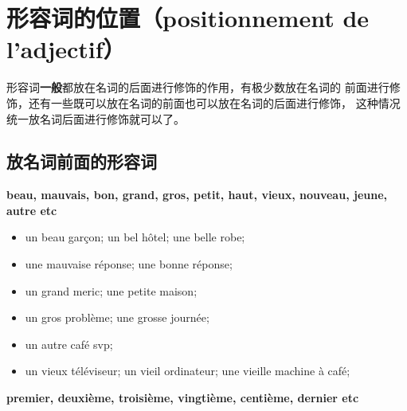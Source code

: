 
\chapter{形容词的位置（positionnement de l'adjectif）}

形容词\textbf{一般}都放在名词的后面进行修饰的作用，有极少数放在名词的
前面进行修饰，还有一些既可以放在名词的前面也可以放在名词的后面进行修饰，
这种情况统一放名词后面进行修饰就可以了。

\section{放名词前面的形容词}

\textbf{beau, mauvais, bon, grand, gros, petit, haut, vieux, nouveau, jeune,
autre etc}

\begin{itemize}
\item un beau garçon; un bel hôtel; une belle robe;
\item une mauvaise réponse; une bonne réponse;
\item un grand meric; une petite maison;
\item un gros problème; une grosse journée;
\item un autre café svp;
\item un vieux téléviseur; un vieil ordinateur; une vieille machine à café;  
\end{itemize}

\textbf{premier, deuxième, troisième, vingtième, centième, dernier etc}



